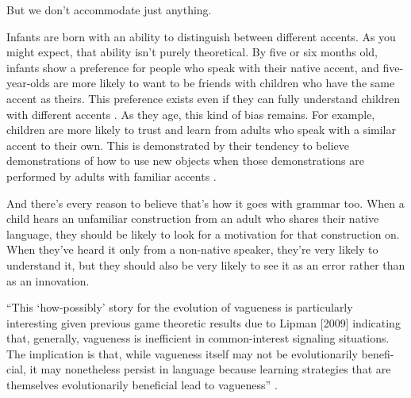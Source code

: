 \bigskip

But we don't accommodate just anything. 

Infants are born with an ability to distinguish between different accents. As you might expect, that ability isn't purely theoretical. By five or six months old, infants show a preference for people who speak with their native accent, and five-year-olds are more likely to want to be friends with children who have the same accent as theirs. This preference exists even if they can fully understand children with different accents \citep{Kinzler2007}. As they age, this kind of bias remains. For example, children are more likely to trust and learn from adults who speak with a similar accent to their own. This is demonstrated by their tendency to believe demonstrations of how to use new objects when those demonstrations are performed by adults with familiar accents \citep{Kinzler2011a}.

And there's every reason to believe that's how it goes with grammar too. When a child hears an unfamiliar construction from an adult who shares their native language, they should be likely to look for a motivation for that construction on. When they've heard it only from a non-native speaker, they're very likely to understand it, but they should also be very likely to see it as an error rather than as an innovation.

``This ‘how-possibly’ story for the evolution of vagueness is particularly interesting given previous game theoretic results due to Lipman [2009] indicating that, generally, vagueness is inefficient in common-interest signaling situations. The implication is that, while vagueness itself may not be evolutionarily benefi- cial, it may nonetheless persist in language because learning strategies that are themselves evolutionarily beneficial lead to vagueness'' \citep[708]{OConnor2014}.
